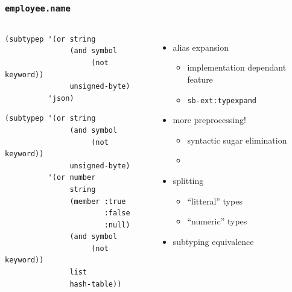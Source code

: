 \documentclass[aspectratio=169]{beamer}
\renewcommand\code[1]{\texttt{#1}}
\begin{document}
\begin{frame}[fragile]
  \frametitle{\code{employee.name}}
  \begin{columns}
  \begin{mintedcodebox}[title=\code{name}'s type verification,icon=\(\lambda\),compact]
    \begin{overprint}
\begin{verbatim}
(subtypep '(or string
               (and symbol
                    (not keyword))
               unsigned-byte)
          'json)
\end{verbatim}

\begin{verbatim}
(subtypep '(or string
               (and symbol
                    (not keyword))
               unsigned-byte)
          '(or number
               string
               (member :true
                       :false
                       :null)
               (and symbol
                    (not keyword))
               list
               hash-table))
\end{verbatim}
    \end{overprint}
  \end{mintedcodebox}

    \begin{itemize}
    \item<2-> alias expansion
      \begin{itemize}
      \item implementation dependant feature
      \item \code{sb-ext:typexpand}
      \end{itemize}
    \item<3-> more preprocessing!
      \begin{itemize}
      \item syntactic sugar elimination
      \item {}
      \end{itemize}
    \item<5-> splitting
      \begin{itemize}
      \item ``litteral'' types
      \item ``numeric'' types
      \end{itemize}
    \item<6-> subtyping equivalence
    \end{itemize}
  \end{columns}
\end{frame}
\end{document}
